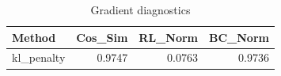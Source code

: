 \begin{table}[htbp]
\centering
\caption{Gradient diagnostics}
\label{tab:grad-diag}
\begin{tabular}{lrrr}
\toprule
\textbf{Method} & \textbf{Cos\_Sim} & \textbf{RL\_Norm} & \textbf{BC\_Norm} \\
\midrule
kl\_penalty & 0.9747 & 0.0763 & 0.9736 \\
\bottomrule
\end{tabular}
\end{table}